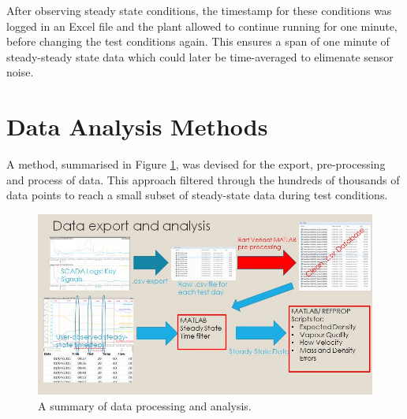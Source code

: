 \documentclass{report}
\begin{document}
After observing steady state conditions, the timestamp for these conditions was logged in an Excel file and the plant allowed to continue running for one minute, before changing the test conditions again. This ensures a span of one minute of steady-steady state data which could later be time-averaged to elimenate sensor noise.
\FloatBarrier
\section{Data Analysis Methods} \label{analysis}
A method, summarised in Figure \ref{fig:processing}, was devised for the export, pre-processing and process of data. This approach filtered through the hundreds of thousands of data points to reach a small subset of steady-state data during test conditions. \\
\FloatBarrier
\begin{figure}
\includegraphics[width=\textwidth]{processing}
\caption{A summary of data processing and analysis.}
\label{fig:processing}
\end{figure}
\FloatBarrier
\end{document}
